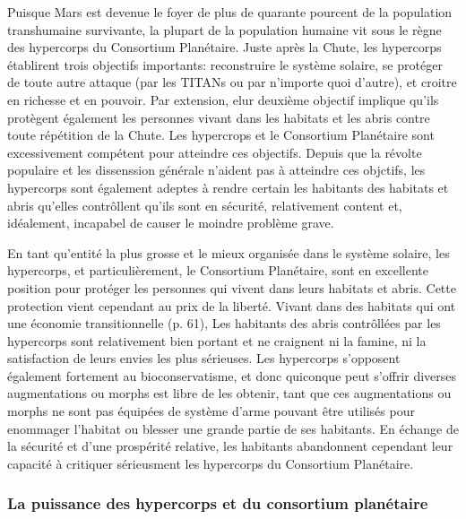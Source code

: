 Puisque Mars est devenue le foyer de plus de quarante pourcent de la population transhumaine survivante, la plupart de la population humaine vit sous le règne des hypercorps du Consortium Planétaire. Juste après la Chute, les hypercorps établirent trois objectifs importants: reconstruire le système solaire, se protéger de toute autre attaque (par les TITANs ou par n'importe quoi d'autre), et croitre en richesse et en pouvoir. Par extension, elur deuxième objectif implique qu'ils protègent également les personnes vivant dans les habitats et les abris contre toute répétition de la Chute. Les hypercrops et le Consortium Planétaire sont excessivement compétent pour atteindre ces objectifs. Depuis que la révolte populaire et les dissenssion générale n'aident pas à atteindre ces objctifs, les hypercorps sont également adeptes à rendre certain les habitants des habitats et abris qu'elles contrôllent qu'ils sont en sécurité, relativement content et, idéalement, incapabel de causer le moindre problème grave. 

En tant qu'entité la plus grosse et le mieux organisée dans le système solaire, les hypercorps, et particulièrement, le Consortium Planétaire, sont en excellente position pour protéger les personnes qui vivent dans leurs habitats et abris. Cette protection vient cependant au prix de la liberté. Vivant dans des habitats qui ont une économie transitionnelle (p. 61), Les habitants des abris contrôllées par les hypercorps sont relativement bien portant et ne craignent ni la famine, ni la satisfaction de leurs envies les plus sérieuses. Les hypercorps s'opposent également fortement au bioconservatisme, et donc quiconque peut s'offrir diverses augmentations ou morphs est libre de les obtenir, tant que ces augmentations ou morphs ne sont pas équipées de système d'arme pouvant être utilisés pour enommager l'habitat ou blesser une grande partie de ses habitants. En échange de la sécurité et d'une prospérité relative, les habitants abandonnent cependant leur capacité à critiquer sérieusment les hypercorps du Consortium Planétaire. 

\subsubsection{La puissance des hypercorps et du consortium planétaire} \label{sec:power-hyperc-plan} 

